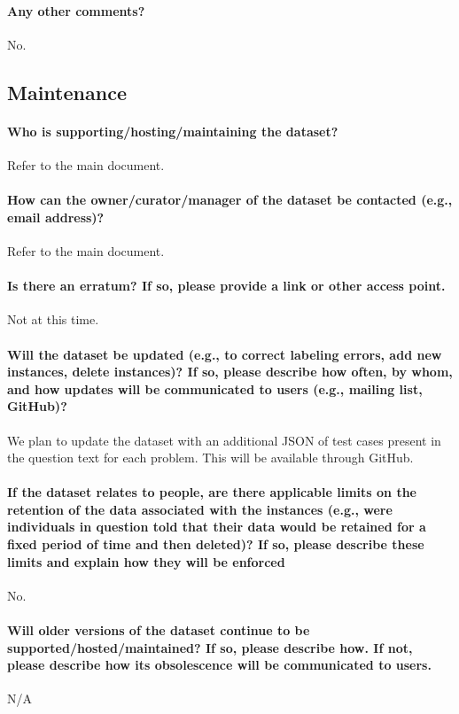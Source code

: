 \documentclass{article}
\begin{document}
\paragraph{Any other comments?}
No.

\subsection{Maintenance}
\paragraph{Who is supporting/hosting/maintaining the dataset?}
Refer to the main document.

\paragraph{How can the owner/curator/manager of the dataset be contacted
(e.g., email address)?}
Refer to the main document.

\paragraph{Is there an erratum? If so, please provide a link or other access point.}
Not at this time.

\paragraph{Will the dataset be updated (e.g., to correct labeling errors, add
new instances, delete instances)? If so, please describe how often, by
whom, and how updates will be communicated to users (e.g., mailing list,
GitHub)?}
We plan to update the dataset with an additional JSON of test cases present in the question text for each problem. This will be available through GitHub.

\paragraph{If the dataset relates to people, are there applicable limits on the
retention of the data associated with the instances (e.g., were individuals in question told that their data would be retained for a
fixed period of time and then deleted)? If so, please describe these
limits and explain how they will be enforced}
No.

\paragraph{Will older versions of the dataset continue to be supported/hosted/maintained?
If so, please describe how. If not, please describe how its obsolescence
will be communicated to users.}
N/A
\end{document}

